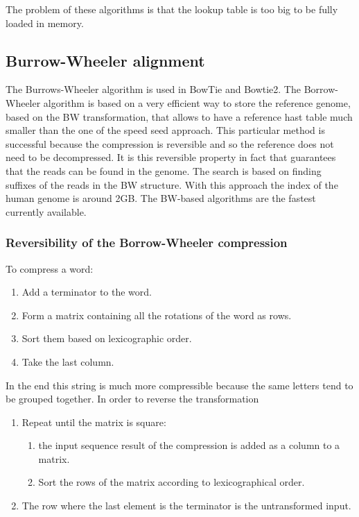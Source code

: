     The problem of these algorithms is that the lookup table is too big to be fully loaded in memory.

    \subsection{Burrow-Wheeler alignment}
    The Burrows-Wheeler algorithm is used in BowTie and Bowtie2.
    The Borrow-Wheeler algorithm is based on a very efficient way to store the reference genome, based on the BW transformation, that allows to have a reference hast table much smaller than the one of the speed seed approach.
    This particular method is successful because the compression is reversible and so the reference does not need to be decompressed.
    It is this reversible property in fact that guarantees that the reads can be found in the genome.
    The search is based on finding suffixes of the reads in the BW structure.
    With this approach the index of the human genome is around 2GB.
    The BW-based algorithms are the fastest currently available.

        \subsubsection{Reversibility of the Borrow-Wheeler compression}
        To compress a word:

        \begin{multicols}{2}
            \begin{enumerate}
                \item Add a terminator to the word.
                \item Form a matrix containing all the rotations of the word as rows.
                \item Sort them based on lexicographic order.
                \item Take the last column.
            \end{enumerate}
        \end{multicols}

        In the end this string is much more compressible because the same letters tend to be grouped together.
        In order to reverse the transformation

        \begin{multicols}{2}
            \begin{enumerate}
                \item Repeat until the matrix is square:
                    \begin{enumerate}
                        \item the input sequence result of the compression is added as a column to a matrix.
                        \item Sort the rows of the matrix according to lexicographical order.
                    \end{enumerate}
                \item The row where the last element is the terminator is the untransformed input.
            \end{enumerate}
        \end{multicols}

